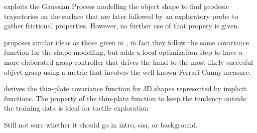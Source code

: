\citet{Rosales2014Active} exploits the Gaussian Process modelling the object shape to find geodesic trajectories on the surface that are later followed by an exploratory probe to gather frictional properties. However, no further use of that propery is given.

\citet{Mahler2015Grasp} proposes similar ideas as those given in \citet{Dragiev2011Gaussian}, in fact they follow the same covariance function for the shape modelling, but adds a local optimization step to have a more elaborated grasp controller that drives the hand to the most-likely succesful object grasp using a metric that involves the well-known Ferrari-Canny measure.

\citet{Williams2007Gaussian} derives the thin-plate covariance function for 3D shapes represented by implicit functions. The property of the thin-plate function to keep the tendency outside the training data is ideal for tactile exploration~\citep[Fig.~2]{Williams2007Gaussian}

Still not sure whether it should go in intro, soa, or background.
\citet{Li2016Dexterous} 
